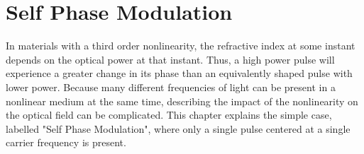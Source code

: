 \chapter{Self Phase Modulation}
\label{ch:SPM}

In materials with a third order nonlinearity, the refractive index at some instant depends on the optical power at that instant. Thus, a high power pulse will experience a greater change in its phase than an equivalently shaped pulse with lower power. Because many different frequencies of light can be present in a nonlinear medium at the same time, describing the impact of the nonlinearity on the optical field can be complicated. This chapter explains the simple case, labelled "Self Phase Modulation", where only a single pulse centered at a single carrier frequency is present.  

